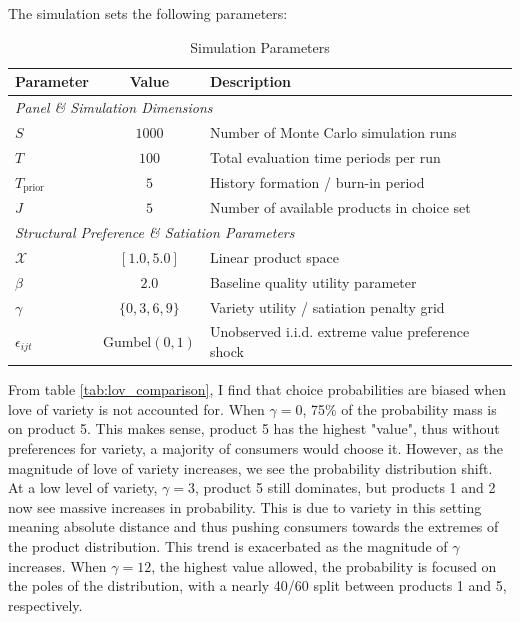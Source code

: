 \documentclass[11pt]{article}
\theoremstyle{definition}
\theoremstyle{remark}
\begin{document}
The simulation sets the following parameters:
\begin{table}[htbp]
  \centering
  \caption*{Simulation Parameters}
  \begin{tabular}{l c l}
    \toprule
    \textbf{Parameter} & \textbf{Value} & \textbf{Description} \\
    \midrule
    \multicolumn{3}{l}{\textit{Panel \& Simulation Dimensions}} \\
    \hspace{1em} $S$ & $1000$ & Number of Monte Carlo simulation runs \\
    \hspace{1em} $T$ & $100$ & Total evaluation time periods per run \\
    \hspace{1em} $T_{\text{prior}}$ & $5$ & History formation / burn-in period \\
    \hspace{1em} $J$ & $5$ & Number of available products in choice set \\
    \midrule
    \multicolumn{3}{l}{\textit{Structural Preference \& Satiation Parameters}} \\
    \hspace{1em} $\mathcal{X}$ & $[1.0, 5.0]$ & Linear product space \\
    \hspace{1em} $\beta$ & $2.0$ & Baseline quality utility parameter \\
    \hspace{1em} $\gamma$ & $\{0, 3, 6, 9\}$ & Variety utility / satiation penalty grid \\
    \hspace{1em} $\epsilon_{ijt}$ & $\text{Gumbel}(0, 1)$ & Unobserved i.i.d. extreme value preference shock \\
    \bottomrule
  \end{tabular}
\end{table}

From table \ref{tab:lov_comparison}, I find that choice probabilities are biased when love of variety is not accounted for. When $\gamma=0$, 75\% of the probability mass is on product 5. This makes sense, product 5 has the highest "value", thus without preferences for variety, a majority of consumers would choose it. However, as the magnitude of love of variety increases, we see the probability distribution shift. At a low level of variety, $\gamma=3$, product 5 still dominates, but products 1 and 2 now see massive increases in probability. This is due to variety in this setting meaning absolute distance and thus pushing consumers towards the extremes of the product distribution. This trend is exacerbated as the magnitude of $\gamma$ increases. When $\gamma=12$, the highest value allowed, the probability is focused on the poles of the distribution, with a nearly 40/60 split between products 1 and 5, respectively.
\end{document}
